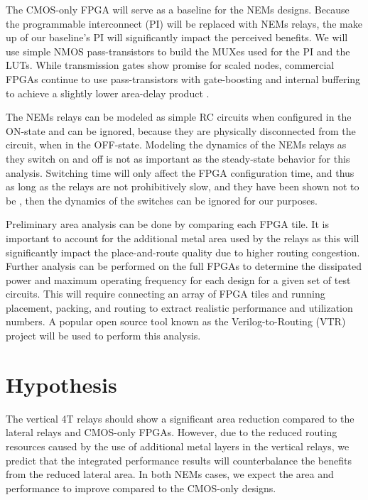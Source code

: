 \documentclass[twoside,twocolumn]{article}
\begin{document}
The CMOS-only FPGA will serve as a baseline for the NEMs designs.
Because the programmable interconnect (PI) will be replaced with NEMs relays, the make up
of our baseline's PI will significantly impact the perceived benefits. 
We will use simple NMOS pass-transistors to build the MUXes used 
for the PI and the LUTs. While transmission gates show promise for scaled nodes, 
commercial FPGAs continue to use pass-transistors with gate-boosting and internal buffering
to achieve a slightly lower area-delay product \cite{chiasson_should_2013}.

The NEMs relays can be modeled as simple RC circuits when configured in the 
ON-state \cite{chen_efficient_2010} \cite{chen_integrated_2008} and can be ignored, 
because they are physically disconnected from the 
circuit, when in the OFF-state. Modeling the dynamics of the NEMs relays
as they switch on and off is not as important as the steady-state behavior
for this analysis. Switching time will only affect the FPGA configuration
time, and thus as long as the relays are not prohibitively slow, and they
have been shown not to be \cite{??}, then the dynamics of the switches can be 
ignored for our purposes.

Preliminary area analysis can be done by comparing each FPGA tile.
It is important to account for the additional metal area used by the 
relays as this will significantly impact the place-and-route quality
due to higher routing congestion. Further analysis can be performed 
on the full FPGAs to determine the dissipated power and maximum 
operating frequency for each design for a given set of test circuits.
This will require connecting an array of FPGA tiles and running 
placement, packing, and routing to extract realistic performance and
utilization numbers. A popular open source tool known as the Verilog-to-Routing 
(VTR) project \cite{vtr8} will be used to perform this analysis.  


\section{Hypothesis}
The vertical 4T relays should show a significant area reduction compared to the
lateral relays and CMOS-only FPGAs. However, due to the reduced routing resources caused
by the use of additional metal layers in the vertical relays, we predict that the integrated
performance results will counterbalance the benefits from the reduced lateral area. In both NEMs 
cases, we expect the area and performance to improve compared to the CMOS-only designs.
\end{document}
